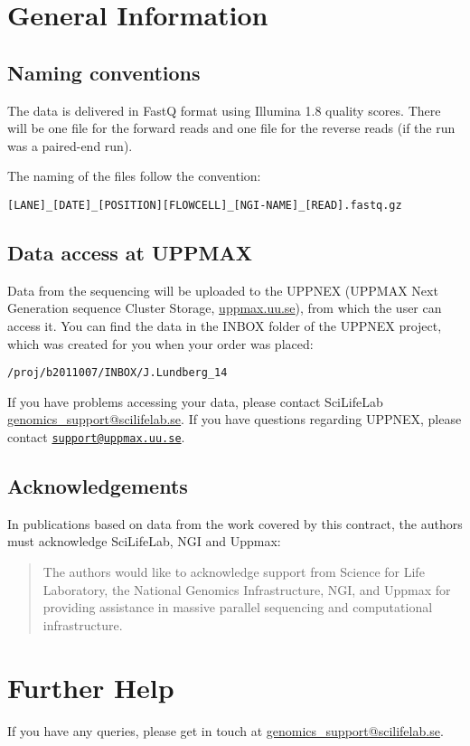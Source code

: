 \documentclass[12pt]{article}
\begin{document}
\section{General Information}\label{general-information}

\subsection{Naming conventions}\label{naming-conventions}

The data is delivered in FastQ format using Illumina 1.8 quality scores.
There will be one file for the forward reads and one file for the
reverse reads (if the run was a paired-end run).

The naming of the files follow the convention:

\begin{verbatim}
[LANE]_[DATE]_[POSITION][FLOWCELL]_[NGI-NAME]_[READ].fastq.gz
\end{verbatim}

\subsection{Data access at UPPMAX}\label{data-access-at-uppmax}

Data from the sequencing will be uploaded to the UPPNEX (UPPMAX Next
Generation sequence Cluster Storage,
\href{http://www.uppmax.uu.se}{uppmax.uu.se}), from which the user can
access it. You can find the data in the INBOX folder of the UPPNEX
project, which was created for you when your order was placed:

\begin{verbatim}
/proj/b2011007/INBOX/J.Lundberg_14
\end{verbatim}

If you have problems accessing your data, please contact SciLifeLab
\href{mailto:\%20genomics_support@scilifelab.se}{genomics\_support@scilifelab.se}.
If you have questions regarding UPPNEX, please contact
\href{mailto:support@uppmax.uu.se}{\nolinkurl{support@uppmax.uu.se}}.

\subsection{Acknowledgements}\label{acknowledgements}

In publications based on data from the work covered by this contract,
the authors must acknowledge SciLifeLab, NGI and Uppmax:

\begin{quote}
The authors would like to acknowledge support from Science for Life
Laboratory, the National Genomics Infrastructure, NGI, and Uppmax for
providing assistance in massive parallel sequencing and computational
infrastructure.
\end{quote}

\section{Further Help}\label{further-help}

If you have any queries, please get in touch at
\href{mailto:\%20genomics_support@scilifelab.se}{genomics\_support@scilifelab.se}.
\end{document}
